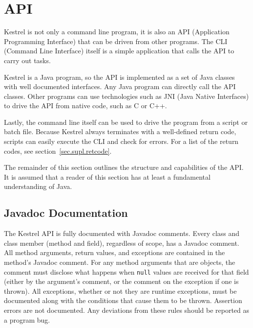 
\section{API}
\label{sec.api}

Kestrel is not only a command line program, it is also an API (Application Programming Interface) that can be driven from other programs. The CLI (Command Line Interface) itself is a simple application that calls the API to carry out tasks.

Kestrel is a Java program, so the API is implemented as a set of Java classes with well documented interfaces. Any Java program can directly call the API classes. Other programs can use technologies such as JNI (Java Native Interfaces) to drive the API from native code, such as C or C++.

Lastly, the command line itself can be used to drive the program from a script or batch file. Because Kestrel always terminates with a well-defined return code, scripts can easily execute the CLI and check for errors. For a list of the return codes, see section~\ref{sec.supl.retcode}.

The remainder of this section outlines the structure and capabilities of the API. It is assumed that a reader of this section has at least a fundamental understanding of Java.


\subsection{Javadoc Documentation}
\label{sec.api.doc}

The Kestrel API is fully documented with Javadoc comments. Every class and class member (method and field), regardless of scope, has a Javadoc comment. All method arguments, return values, and exceptions are contained in the method's Javadoc comment. For any method arguments that are objects, the comment must disclose what happens when \texttt{null} values are received for that field (either by the argument's comment, or the comment on the exception if one is thrown). All exceptions, whether or not they are runtime exceptions, must be documented along with the conditions that cause them to be thrown. Assertion errors are not documented. Any deviations from these rules should be reported as a program bug.

